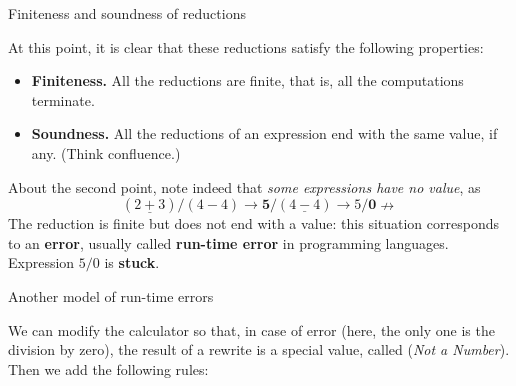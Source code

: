 %
\begin{frame}{Finiteness and soundness of reductions}

  At this point, it is clear that these reductions satisfy the
  following properties:
  \begin{itemize}

    \item \textbf{Finiteness.} All the reductions are finite, that is,
      all the computations terminate.

    \item \textbf{Soundness.} All the reductions of an expression end
      with the same value, if any. (Think confluence.)

  \end{itemize}

  About the second point, note indeed that \emph{some expressions have
  no value}, as
  \begin{equation*}
    (\underline{2+3})/(4-4) \rightarrow \textbf{5}/(\underline{4-4})
    \rightarrow 5/\textbf{0} \nrightarrow
  \end{equation*}
  The reduction is finite but does not end with a value: this
  situation corresponds to an \textbf{error}, usually called
  \textbf{run\hyp{}time error} in programming languages. Expression
  \(5/0\) is \textbf{stuck}.

\end{frame}

%
\begin{frame}{Another model of run-time errors}

  We can modify the calculator so that, in case of error (here, the
  only one is the division by zero), the result of a rewrite is a
  special value, called \NaN (\emph{Not a Number}). Then we add the
  following rules:

\end{frame}

